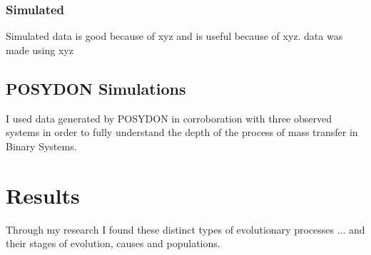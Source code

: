 \documentclass[12pt, letterpaper]{article}
\begin{document}
        \subsubsection{Simulated}
        Simulated data is good because of xyz and is useful because of xyz. data was made using xyz

    \subsection{POSYDON Simulations}
         I used data generated by POSYDON \cite{Fragos_2023} in corroboration with three observed systems in order to fully understand the depth of the process of mass transfer in Binary Systems.
    \cite{TaurisvandenHeuvel+2023}


\section{\centering Results}
    Through my research I found these distinct types of evolutionary processes ... and their stages of evolution, causes and populations. 
    
\end{document}
